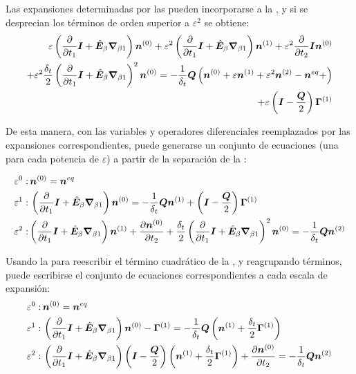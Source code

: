 Las expansiones determinadas por las  pueden incorporarse a la , y si se desprecian los t\'erminos de orden superior a $\varepsilon^2$ se obtiene:
\begin{equation}
	\begin{aligned}
		\varepsilon \left( \dfrac{\partial}{\partial t_1}\bm{I} + \hat{\bm{E}}_{\beta} \bm{\nabla}_{\beta 1} \right) \bm{n}^{(0)} + \varepsilon^2 \left( \dfrac{\partial}{\partial t_1}\bm{I} + \hat{\bm{E}}_{\beta} \bm{\nabla}_{\beta 1} \right) \bm{n}^{(1)} + \varepsilon^2 \dfrac{\partial}{\partial t_2} \bm{I} \bm{n}^{(0)} \\
		+ \varepsilon^2 \dfrac{\delta_t}{2} \left( \dfrac{\partial}{\partial t_1}\bm{I} + \hat{\bm{E}}_{\beta} \bm{\nabla}_{\beta 1} \right)^2 \bm{n}^{(0)} = -\dfrac{1}{\delta_t} \bm{Q} \left( \bm{n}^{(0)} + \varepsilon \bm{n}^{(1)} + \varepsilon^2 \bm{n}^{(2)} - \bm{n}^{eq} +  \right) \\
		+ \varepsilon \left( \bm{I}-\dfrac{\bm{Q}}{2}\right) \bm{\Gamma}^{(1)}
	\end{aligned}
	\label{eq:modelo_2d_escalas}
\end{equation}

De esta manera, con las variables y operadores diferenciales reemplazados por las expansiones correspondientes, puede generarse un conjunto de ecuaciones (una para cada potencia de $\varepsilon$) a partir de la separaci\'on de la :

\begin{subequations}
	\begin{align}
		\varepsilon^0: \, & \bm{n}^{(0)} = \bm{n}^{eq}\\
		\varepsilon^1: \, & \left( \dfrac{\partial}{\partial t_1}\bm{I} + \hat{\bm{E}}_{\beta} \bm{\nabla}_{\beta 1} \right) \bm{n}^{(0)} = -\dfrac{1}{\delta_t} \bm{Q} \bm{n}^{(1)} + \left( \bm{I}-\dfrac{\bm{Q}}{2}\right) \bm{\Gamma}^{(1)} \label{eq:eps_1_0} \\	
		\varepsilon^2: \, & { \left( \dfrac{\partial}{\partial t_1}\bm{I} + \hat{\bm{E}}_{\beta} \bm{\nabla}_{\beta 1} \right) \bm{n}^{(1)} + \dfrac{\partial \bm{n}^{(0)}}{\partial t_2}  + \dfrac{\delta_t}{2} \left( \dfrac{\partial}{\partial t_1}\bm{I} + \hat{\bm{E}}_{\beta} \bm{\nabla}_{\beta 1} \right)^2 \bm{n}^{(0)}  = -\dfrac{1}{\delta_t} \bm{Q} \bm{n}^{(2)}} \label{eq:eps_2_0}
	\end{align}
\end{subequations}


Usando la  para reescribir el t\'ermino cuadr\'atico de la , y reagrupando t\'erminos, puede escribirse el conjunto de ecuaciones correspondientes a cada escala de expansi\'on:
\begin{subequations}
	\begin{align}
		\varepsilon^0: \, & \bm{n}^{(0)} = \bm{n}^{eq} \label{eq:eps_0}\\
		\varepsilon^1: \, & \left( \dfrac{\partial}{\partial t_1}\bm{I} + \hat{\bm{E}}_{\beta} \bm{\nabla}_{\beta 1} \right) \bm{n}^{(0)} - \bm{\Gamma}^{(1)} = -\dfrac{1}{\delta_t} \bm{Q} \left( \bm{n}^{(1)} + \dfrac{\delta_t}{2} \bm{\Gamma}^{(1)} \right)  \label{eq:eps_1}\\
		\varepsilon^2: \, & \left( \dfrac{\partial}{\partial t_1}\bm{I} + \hat{\bm{E}}_{\beta} \bm{\nabla}_{\beta 1} \right) \left( \bm{I}-\dfrac{\bm{Q}}{2}\right) \left( \bm{n}^{(1)} + \dfrac{\delta_t}{2} \bm{\Gamma}^{(1)} \right) + \dfrac{\partial \bm{n}^{(0)}}{\partial t_2}  =  -\dfrac{1}{\delta_t} \bm{Q} \bm{n}^{(2)} \label{eq:eps_2}
	\end{align}
\end{subequations}

